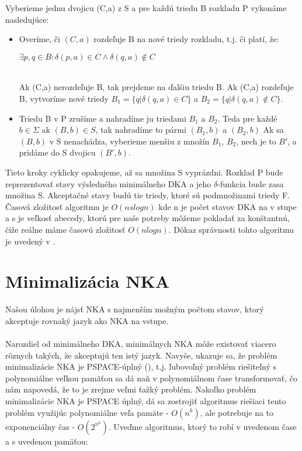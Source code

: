 Vyberieme jednu dvojicu (C,a) z S a pre každú triedu B rozkladu P vykonáme nasledujúce:
\begin{itemize}
  \item Overíme, či $(C,a)$ rozdeľuje B na nové triedy rozkladu, t.j. či platí, že:
  \\
  \centerline{$\exists p,q \in B: \delta(p,a) \in C \wedge \delta(q,a) \not\in C$}
  \\ Ak (C,a) nerozdeľuje B, tak prejdeme na ďalšiu triedu B. Ak (C,a) rozdeľuje B, vytvoríme nové triedy $B_1 = \{q|\delta(q,a) \in C\}$ a $B_2 = \{q|\delta(q,a) \not\in C\}$.
  \item  Triedu B v P zrušíme a nahradíme ju triedami $B_1$ a $B_2$. Teda pre každé $b \in \Sigma$ ak $(B,b) \in S$, tak nahradíme to pármi $(B_1,b)$ a $(B_2,b)$ Ak sa $(B,b)$ v S nenachádza, vyberieme menšiu z množín $B_1$, $B_2$, nech je to $B'$, a pridáme do S dvojicu $(B',b)$.
\end{itemize}
Tieto kroky cyklicky opakujeme, až sa množina S vyprázdni. Rozklad P bude reprezentovať stavy výsledného minimálneho DKA a jeho $\delta$-funkcia bude zasa množina S. Akceptačné stavy budú tie triedy, ktoré sú podmnožinami triedy F. Časová zložitosť algoritmu je $O(ns log n)$ kde n je počet stavov DKA na v stupe a s je veľkosť abecedy, ktorú pre naše potreby môžeme pokladať za konštantnú, čiže reálne máme časovú zložitosť $O(n log n)$. Dôkaz správnosti tohto algoritmu je uvedený v \cite{hudakova}.


\section{Minimalizácia NKA}

Našou úlohou je nájsť NKA s najmenším možným počtom stavov, ktorý akceptuje rovnaký jazyk ako NKA na vstupe.
\paragraph{}
Narozdiel od minimálneho DKA, minimálnych NKA môže existovať viacero rôznych takých, že akceptujú ten istý jazyk.
Navyše, ukazuje sa, že problém minimalizácie NKA je PSPACE-úplný (\cite{jiang}), t.j. ľubovoľný problém riešiteľný s polynomiálne veľkou pamäťou sa dá naň v polynomiálnom čase transformovať, čo nám napovedá, že to je zrejme veľmi ťažký problém. 
Nakoľko problém minimalizácie NKA je PSPACE úplný, dá sa zostrojiť algoritmus riešiaci tento problém využijúc polynomiálne veľa pamäte - $O(n^k)$, ale potrebuje na to exponenciálny čas - $O(2^{n^k})$. Uveďme algoritmus, ktorý to robí v uvedenom čase a s uvedenou pamäťou:
